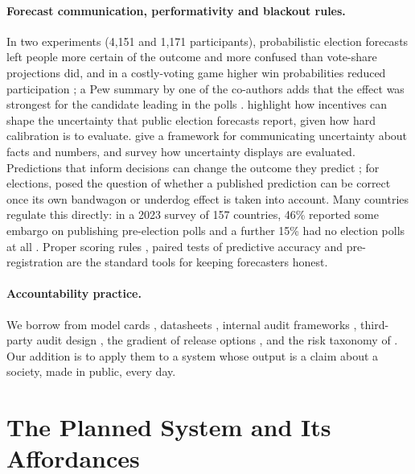 \documentclass[11pt]{article}
\begin{document}
\paragraph{Forecast communication, performativity and blackout rules.} In two experiments (4,151 and 1,171 participants), probabilistic election forecasts left people more certain of the outcome and more confused than vote-share projections did, and in a costly-voting game higher win probabilities reduced participation \citep{westwood2020projecting}; a Pew summary by one of the co-authors adds that the effect was strongest for the candidate leading in the polls \citep{pew2018forecasts}. \citet{gelman2020information} highlight how incentives can shape the uncertainty that public election forecasts report, given how hard calibration is to evaluate. \citet{vanderbles2019communicating} give a framework for communicating uncertainty about facts and numbers, and \citet{hullman2019error} survey how uncertainty displays are evaluated. Predictions that inform decisions can change the outcome they predict \citep{perdomo2020performative}; for elections, \citet{simon1954bandwagon} posed the question of whether a published prediction can be correct once its own bandwagon or underdog effect is taken into account. Many countries regulate this directly: in a 2023 survey of 157 countries, 46\% reported some embargo on publishing pre-election polls and a further 15\% had no election polls at all \citep{esomarwapor2023}. Proper scoring rules \citep{brier1950verification,gneiting2007scoring}, paired tests of predictive accuracy \citep{diebold1995comparing} and pre-registration \citep{nosek2018preregistration} are the standard tools for keeping forecasters honest.

\paragraph{Accountability practice.} We borrow from model cards \citep{mitchell2019modelcards}, datasheets \citep{gebru2018datasheets}, internal audit frameworks \citep{raji2020closing}, third-party audit design \citep{raji2022outsider}, the gradient of release options \citep{solaiman2023gradient}, and the risk taxonomy of \citet{weidinger2021risks}. Our addition is to apply them to a system whose output is a claim about a society, made in public, every day.

\section{The Planned System and Its Affordances}
\label{sec:system}
\end{document}
